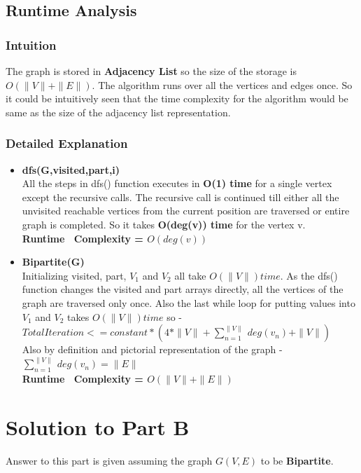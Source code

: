 \documentclass[20pt]{article}
\begin{document}
\newpage
\subsection{Runtime Analysis}
\subsubsection{Intuition}
The graph is stored in \textbf{Adjacency List} so the size of the storage is \\ 
\textbf{$O(\|V\|+\|E\|)$}. The algorithm runs over all the vertices and edges once. So it could be intuitively seen that the time complexity for the algorithm would be same as the size of the adjacency list representation.
\subsubsection{Detailed Explanation}
\begin{itemize}
\item \textbf{dfs(G,visited,part,i)} \\
All the steps in dfs() function executes in \textbf{O(1) time} for a single vertex except the recursive calls. The recursive call is continued till either all the unvisited reachable vertices from the current position are traversed or entire graph is completed. So it takes \textbf{O(deg(v)) time} for the vertex v. \\
\textbf{Runtime ~Complexity = $O(deg(v))$}
\item \textbf{Bipartite(G)} \\
Initializing visited, part, $V_1$ and $V_2$ all take \textbf{$O(\|V\|) time$}. As the dfs() function changes the visited and part arrays directly, all the vertices of the graph are traversed only once. Also the last while loop for putting values into $V_1$ and $V_2$ takes \textbf{$O(\|V\|) time$} so - \\
$Total Iteration <= constant*(4*\|V\|+\sum_{n=1}^{\|V\|}~deg(v_n)+\|V\|)$ \\
Also by definition and pictorial representation of the graph - \\
$\sum_{n=1}^{\|V\|}~deg(v_n) = \|E\| $ \\
\textbf{Runtime ~Complexity = $O(\|V\|+\|E\|)$}
\end{itemize}

\newpage
\section{Solution to Part B}
Answer to this part is given assuming the graph $G(V,E)$ to be \textbf{Bipartite}.
\end{document}
